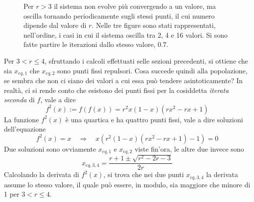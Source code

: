 \begin{figure}[h!]
\begin{center}
        \captionsetup{width=.8\linewidth}   
    \caption{Per $r > 3$ il sistema non evolve più convergendo a un valore, ma oscilla tornando periodicamente sugli stessi punti, il cui numero dipende dal valore di $r$. Nelle tre figure sono stati rappresentati, nell'ordine, i casi in cui il sistema oscilla tra 2, 4 e 16 valori. Si sono fatte partire le iterazioni dallo stesso valore, $0.7$.}
    \label{fig:oscillazioni}
    \end{center}
\end{figure}

Per $3 < r \leq 4$, sfruttando i calcoli effettuati selle sezioni precedenti, si ottiene che sia $x_{eq,1}$ che $x_{eq,2}$ sono punti fissi repulsori. Cosa succede quindi alla popolazione, se sembra che non ci siano dei valori a cui essa può tendere asintoticamente? In realtà, ci si rende conto che esistono dei punti fissi per la cosiddetta \textit{iterata seconda} di $f$, vale a dire 
\begin{equation*}
f^2(x) := f(f(x)) = r^2 x (1-x) (rx^2 -rx +1)
\end{equation*}
La funzione $f^2(x)$ è una quartica e ha quattro punti fissi, vale a dire soluzioni dell'equazione 
\begin{equation*}
    f^2(x) = x \quad \Rightarrow \quad x (r^2 (1-x) (rx^2 -rx +1) - 1) = 0
\end{equation*}
Due soluzioni sono ovviamente $x_{eq,1}$ e $x_{eq,2}$ viste fin'ora, le altre due invece sono 
\[
    \boxed{x_{eq,3,4} = \dfrac{r +1 \pm \sqrt{r^2 -2r -3}}{2r}}
\]
Calcolando la derivata di $f^2(x)$, si trova che nei due punti $x_{eq,3,4}$ la derivata assume lo stesso valore, il quale può essere, in modulo, sia maggiore che minore di 1 per $ 3 < r \leq 4$. 

